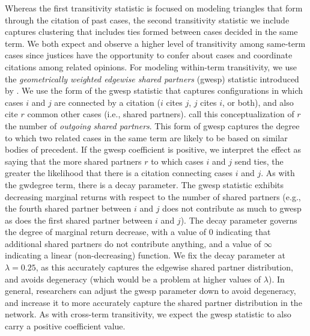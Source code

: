 \documentclass{cup-pan}
\begin{document}
Whereas the first transitivity statistic is focused on modeling triangles that form through the citation of past cases, the second transitivity statistic we include captures clustering that includes ties formed between cases decided in the same term. We both expect and observe a higher level of transitivity among same-term cases since justices have the opportunity to confer about cases and coordinate citations among related opinions. For modeling within-term transitivity, we use the \textit{geometrically weighted edgewise shared partners} (gwesp) statistic introduced by \citet{hunter2006inference}. We use the form of the gwesp statistic that captures configurations in which cases $i$ and $j$ are connected by a citation ($i$ cites $j$, $j$ cites $i$, or both), and also cite $r$ common other cases (i.e., shared partners). \citet{Butts.2008} call this conceptualization of $r$ the number of \textit{outgoing shared partners}. This form of gwesp captures the degree to which two related cases in the same term are likely to be based on similar bodies of precedent. If the gwesp coefficient is positive, we interpret the effect as saying that the more shared partners $r$ to which cases $i$ and $j$ send ties, the greater the likelihood that there is a citation connecting cases $i$ and $j$.  As with the gwdegree term, there is a decay parameter. The gwesp statistic exhibits decreasing marginal returns with respect to the number of shared partners (e.g., the fourth shared partner between $i$ and $j$ does not contribute as much to gwesp as does the first shared partner between $i$ and $j$). The decay parameter governs the degree of marginal return decrease, with a value of 0 indicating that additional shared partners do not contribute anything, and a value of $\infty$ indicating a linear (non-decreasing) function.  We fix the decay parameter at $\lambda=0.25$, as this accurately captures the edgewise shared partner distribution, and avoids degeneracy (which would be a problem at higher values of $\lambda$). In general, researchers can adjust the gwesp parameter down to avoid degeneracy, and increase it to more accurately capture the shared partner distribution in the network. As with cross-term transitivity, we expect the gwesp statistic to also carry a positive coefficient value.
\end{document}
